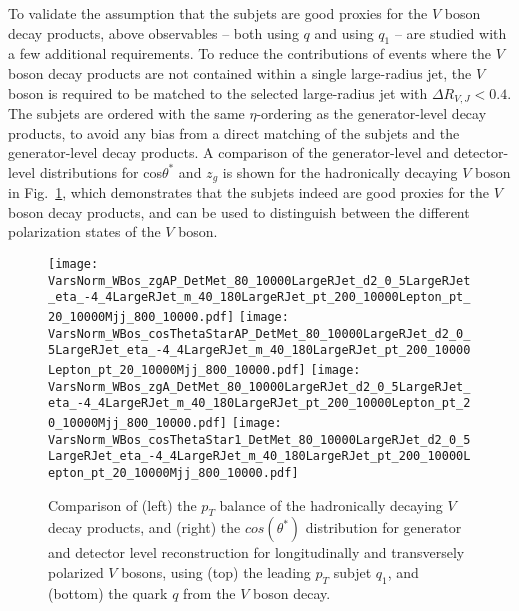 \documentclass[amsmath,amssymb,aps,prd,preprint,groupedaddress]{revtex4-2}
\begin{document}
To validate the assumption that the subjets are good proxies for the $V$ boson decay products, above observables -- both using $q$ and using $q_1$ -- are studied with a few additional requirements.
To reduce the contributions of events where the $V$ boson decay products are not contained within a single large-radius jet, the $V$ boson is required to be matched to the selected large-radius jet with $\Delta R_{V, J} < 0.4$.
The subjets are ordered with the same $\eta$-ordering as the generator-level decay products, to avoid any bias from a direct matching of the subjets and the generator-level decay products.
A comparison of the generator-level and detector-level distributions for cos$\theta^*$ and $z_g$ is shown for the hadronically decaying $V$ boson in Fig.~\ref{fig:wbos}, which demonstrates that the subjets indeed are good proxies for the $V$ boson decay products, and can be used to distinguish between the different polarization states of the $V$ boson.

\begin{figure}[thb]
  \centering
  \texttt{[image: VarsNorm\_WBos\_zgAP\_DetMet\_80\_10000LargeRJet\_d2\_0\_5LargeRJet\_eta\_-4\_4LargeRJet\_m\_40\_180LargeRJet\_pt\_200\_10000Lepton\_pt\_20\_10000Mjj\_800\_10000.pdf]}
  \texttt{[image: VarsNorm\_WBos\_cosThetaStarAP\_DetMet\_80\_10000LargeRJet\_d2\_0\_5LargeRJet\_eta\_-4\_4LargeRJet\_m\_40\_180LargeRJet\_pt\_200\_10000Lepton\_pt\_20\_10000Mjj\_800\_10000.pdf]}
  \texttt{[image: VarsNorm\_WBos\_zgA\_DetMet\_80\_10000LargeRJet\_d2\_0\_5LargeRJet\_eta\_-4\_4LargeRJet\_m\_40\_180LargeRJet\_pt\_200\_10000Lepton\_pt\_20\_10000Mjj\_800\_10000.pdf]}
  \texttt{[image: VarsNorm\_WBos\_cosThetaStar1\_DetMet\_80\_10000LargeRJet\_d2\_0\_5LargeRJet\_eta\_-4\_4LargeRJet\_m\_40\_180LargeRJet\_pt\_200\_10000Lepton\_pt\_20\_10000Mjj\_800\_10000.pdf]}
  \caption{Comparison of (left) the $p_T$ balance of the hadronically decaying $V$ decay products, and (right) the $cos(\theta^{*})$ distribution for generator and detector level reconstruction for longitudinally and transversely polarized $V$ bosons, using (top) the leading $p_T$ subjet $q_1$, and (bottom) the quark $q$ from the $V$ boson decay.}
  \label{fig:wbos}
\end{figure}
\end{document}
